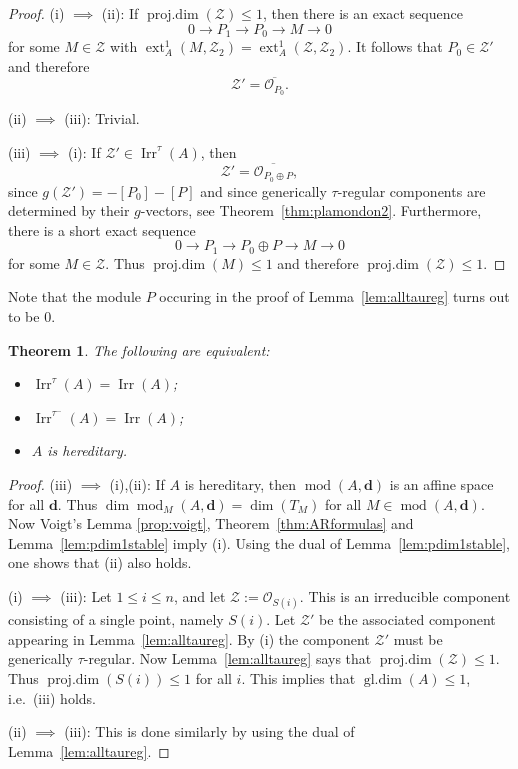 \documentclass[12pt,reqno]{amsart}
\newtheorem{Thm}{Theorem}[section]
\theoremstyle{definition}
\newcommand{\cO}{{\mathcal O}}
\newcommand{\bd}{\mathbf{d}}
\newcommand{\md}{\operatorname{mod}}
\newcommand{\gldim}{\operatorname{gl.dim}}
\newcommand{\pdim}{\operatorname{proj.dim}}
\newcommand{\ext}{\operatorname{ext}}
\newcommand{\irr}{\operatorname{Irr}}
\newcommand{\calZ}{\mathcal{Z}}
\begin{document}
\begin{proof}
(i) $\implies$ (ii):
If $\pdim(\calZ) \le 1$, then
there is an exact sequence
$$
0 \to P_1 \to P_0 \to M \to 0
$$
for some $M \in \calZ$ with $\ext_A^1(M,\calZ_2) = \ext_A^1(\calZ,\calZ_2)$.
It follows that $P_0 \in \calZ'$ and therefore
$$
\calZ' = \overline{\cO_{P_0}}.
$$

(ii) $\implies$ (iii): Trivial.

(iii) $\implies$ (i):
If $\calZ' \in \irr^\tau(A)$, then
$$
\calZ' = \overline{\cO_{P_0 \oplus P}},
$$
since $g(\calZ') = -[P_0]-[P]$ and since generically $\tau$-regular components are determined by their $g$-vectors, see Theorem~\ref{thm:plamondon2}.
Furthermore, there is a short exact sequence
$$
0 \to P_1 \to P_0 \oplus P \to M \to 0
$$
for some $M \in \calZ$.
Thus $\pdim(M) \le 1$ and therefore $\pdim(\calZ) \le 1$.
\end{proof}

Note that the module $P$ occuring in the proof of
Lemma~\ref{lem:alltaureg} turns out to be $0$.



\begin{Thm}\label{thm:main1b}
The following are equivalent:
\begin{itemize}\itemsep2mm

\item[(i)]
$\irr^\tau(A) = \irr(A)$;

\item[(ii)]
$\irr^{\tau^-}(A) = \irr(A)$;

\item[(iii)]
$A$ is hereditary.

\end{itemize}
\end{Thm}

\begin{proof}
(iii) $\implies$ (i),(ii):
If $A$ is hereditary, then $\md(A,\bd)$ is an affine space for all
$\bd$.
Thus $\dim \md_M(A,\bd) = \dim(T_M)$ for all
$M \in \md(A,\bd)$.
Now Voigt's Lemma \ref{prop:voigt},
Theorem~\ref{thm:ARformulas} and
Lemma~\ref{lem:pdim1stable}
imply (i).
Using the dual of Lemma~\ref{lem:pdim1stable}, one shows that (ii) also holds.

(i) $\implies$ (iii):
Let $1 \le i \le n$, and let
$\calZ := \cO_{S(i)}$.
This is an irreducible component consisting of a single point,
namely $S(i)$.
Let $\calZ'$ be the associated component appearing in Lemma~\ref{lem:alltaureg}.
By (i) the component $\calZ'$ must be generically $\tau$-regular.
Now Lemma~\ref{lem:alltaureg} says that $\pdim(\calZ) \le 1$.
Thus $\pdim(S(i)) \le 1$ for all $i$.
This implies that $\gldim(A) \le 1$, i.e.\ (iii) holds.

(ii) $\implies$ (iii):
This is done similarly by using the dual of
Lemma~\ref{lem:alltaureg}.
\end{proof}
\end{document}
